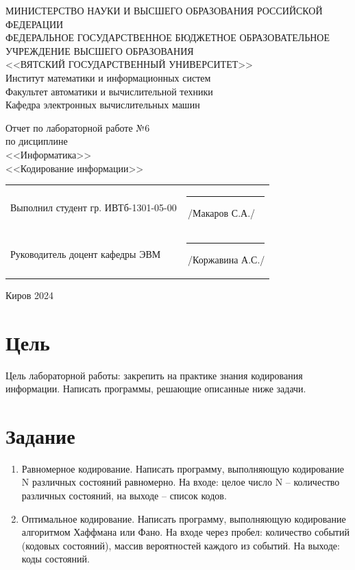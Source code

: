 \documentclass[a4paper,14pt]{extarticle}
\begin{document}
	
	\newpage\thispagestyle{empty}
	\begin{center}
		\MakeUppercase{
			Министерство науки и высшего образования Российской Федерации\\
			Федеральное государственное бюджетное образовательное учреждение высшего образования\\
			<<Вятский Государственный Университет>>\\
		}
		Институт математики и информационных систем\\
		Факультет автоматики и вычислительной техники\\
		Кафедра электронных вычислительных машин
	\end{center}
	\vfill
	
	\begin{center}
		Отчет по лабораторной работе №6\\
		по дисциплине\\
		<<Информатика>>\\
		<<Кодирование информации>>
	\end{center}
	\vfill
	
	\noindent
	\begin{tabular}{ll}
		Выполнил студент гр. ИВТб-1301-05-00 \hspace{5mm} &
		\rule[-1mm]{25mm}{0.10mm}\,/Макаров С.А./\\
		
		Руководитель доцент кафедры ЭВМ & \rule[-1mm]{25mm}{0.10mm}\,/Коржавина А.С./\\
	\end{tabular}
	
	\vfill
	\begin{center}
		Киров 2024
	\end{center}
	
	\newpage
	\section*{Цель}
	Цель лабораторной работы: закрепить на практике знания кодирования информации. Написать программы, решающие описанные ниже задачи.
	
	\section*{Задание}
	\begin{enumerate}
		\item Равномерное кодирование. Написать программу, выполняющую кодирование N различных состояний равномерно. На входе: целое число N -- количество различных состояний, на выходе -- список кодов.
		
		\item Оптимальное кодирование. Написать программу, выполняющую кодирование алгоритмом Хаффмана или Фано. На входе через пробел: количество событий (кодовых состояний), массив вероятностей каждого из событий. На выходе: коды состояний.
	\end{enumerate}
	
\end{document}
